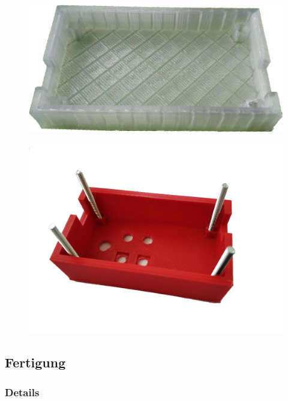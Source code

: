 \documentclass[a4paper, 12pt]{article}
\begin{document}
      \begin{figure}[h!]
      \centering
        \begin{minipage}{.5\textwidth}
          \centering
          \includegraphics[width=.9\linewidth]{graphics/gehaeuse_gedruckt_unten.jpg}
          \label{fig:gedruckt1}
        \end{minipage}%
        \begin{minipage}{.5\textwidth}
          \centering
          \includegraphics[width=.9\linewidth]{graphics/gehaeuse_gedruckt_oben.png}
          \label{fig:gedruckt2}
        \end{minipage}
      \end{figure}



  \subsection{Fertigung}

    \subsubsection{Details}
\end{document}
